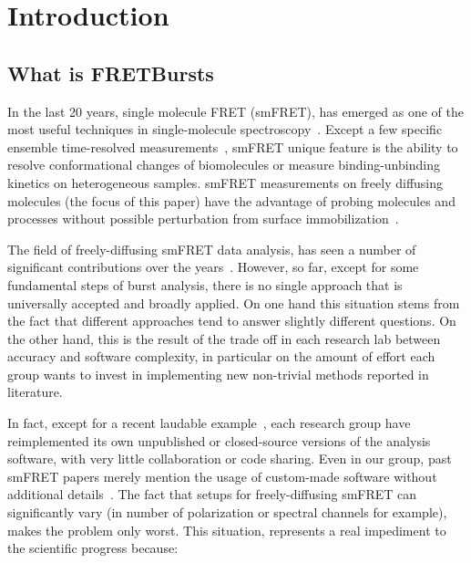 \section{Introduction}

\subsection{What is FRETBursts}

In the last 20 years, single molecule FRET (smFRET), has emerged as one of the most
useful techniques in single-molecule spectroscopy~\cite{Weiss_1999,Hohlbein_2014}. 
Except a few specific ensemble time-resolved measurements~\cite{Lerner_2014,Rahamim_2015}, 
smFRET unique feature is the ability to resolve conformational 
changes of biomolecules or measure binding-unbinding kinetics on heterogeneous samples. 
smFRET measurements on freely diffusing molecules (the focus of this paper) have the advantage 
of probing molecules and processes without possible perturbation from surface 
immobilization~\cite{Dahan_1999,Eggeling_1998}. 

The field of freely-diffusing smFRET data analysis, has seen a number of significant 
contributions over the 
years~\cite{Fries_1998,Eggeling_2001,Zhang_2005,Gopich_2005,Lee_2005,Nir_2006,Antonik2006,Gopich_2007,Gopich_2008,Camley_2009,Santoso_2010,Torella_2011,Tomov_2012}. 
However, so far, except for some fundamental steps of burst analysis, 
there is no single approach that is universally accepted and broadly applied. 
On one hand this situation stems from the fact that
different approaches tend to answer slightly different questions.
On the other hand, this is the result of the trade off in each research lab
between accuracy and software complexity, in particular on the amount of effort
each group wants to invest in implementing new non-trivial methods reported in literature.

In fact, except for a recent laudable example~\cite{Murphy2014}, 
each research group have reimplemented its own unpublished or closed-source versions
of the analysis software, with very little collaboration or code sharing.
Even in our group, past smFRET papers merely mention the usage of custom-made software without 
additional details~\cite{Lee_2005,Nir_2006}.
The fact that setups for freely-diffusing smFRET can significantly 
vary (in number of polarization or spectral channels for example), 
makes the problem only worst.
This situation, represents a real impediment to the scientific progress because:

